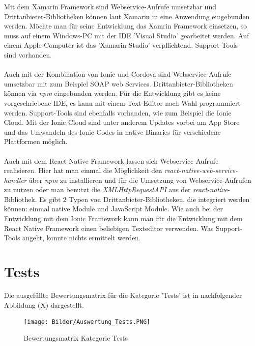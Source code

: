 Mit dem Xamarin Framework sind Webservice-Aufrufe umsetzbar und Drittanbieter-Bibliotheken können laut Xamarin in eine Anwendung eingebunden werden. Möchte man für seine Entwicklung das Xamrin Framework einsetzen, so muss auf einem Windows-PC mit der IDE 'Visual Studio' gearbeitet werden. Auf einem Apple-Computer ist das 'Xamarin-Studio' verpflichtend. Support-Tools sind vorhanden. 
\\
\\
Auch mit der Kombination von Ionic und Cordova sind Webservice Aufrufe umsetzbar mit zum Beispiel SOAP web Services. Drittanbieter-Bibliotheken können via \textit{npm} eingebunden werden. Für die Entwicklung gibt es keine vorgeschriebene IDE, es kann mit einem Text-Editor nach Wahl programmiert werden. Support-Tools sind ebenfalls vorhanden, wie zum Beispiel die Ionic Cloud. Mit der Ionic Cloud sind unter anderem Updates vorbei am App Store und das Umwandeln des Ionic Codes in native Binaries für verschiedene Plattformen möglich. 
\\
\\
Auch mit dem React Native Framework lassen sich Webservice-Aufrufe realisieren. Hier hat man einmal die Möglichkeit den \textit{react-native-web-service-handler} über \textit{npm} zu installieren und für die Umsetzung von Webservice-Aufrufen zu nutzen oder man benutzt die \textit{XMLHttpRequestAPI} aus der \textit{react-native}-Bibliothek. Es gibt 2 Typen von Drittanbieter-Bibliotheken, die integriert werden können: einmal native Module und JavaScript Module. Wie auch bei der Entwicklung mit dem Ionic Framework kann man für die Entwicklung mit dem React Native Framework einen beliebigen Texteditor verwenden. Was Support-Tools angeht, konnte nichts ermittelt werden.

\section{Tests}

Die ausgefüllte Bewertungsmatrix für die Kategorie 'Tests' ist in nachfolgender Abbildung (X) dargestellt.

\begin{figure}[h]
	\centering
	\texttt{[image: Bilder/Auswertung\_Tests.PNG]}
	\caption{Bewertungsmatrix Kategorie Tests}
	\label{fig:AuswTest}
\end{figure}

